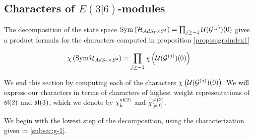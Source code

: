 \subsection{Characters of $E(3|6)$-modules}\label{e36char}
The decomposition of the state space $\text{Sym} \left (\mathcal{H}_{AdS_7\times S^4}\right ) = \prod_{j\geq -1} \mathcal{U} (\mathcal{G}^{(j)})(0)$ gives a product formula for the characters computed in proposition \ref{prop:sugraindex1}

\[ \chi \left ( \text{Sym} \mathcal{H}_{AdS_7\times S^4} \right ) = \prod_{j\geq -1} \chi \left (\mathcal{U} (\mathcal{G}^{(j)})(0) \right ) \]

We end this section by computing each of the characters $\chi \left (\mathcal{U} (\mathcal{G}^{(j)})(0) \right )$. We will express our characters in terms of characters of highest weight representations of $\mathfrak{sl}(2)$ and $\mathfrak{sl}(3)$, which we denote by $\chi_k^{\mathfrak{sl}(2)}$ and $\chi^{\mathfrak{sl}(3)}_{[k,l]}$.

\parsec[]
We begin with the lowest step of the decomposition, using the characterization given in \ref{subsec:g-1}. 

